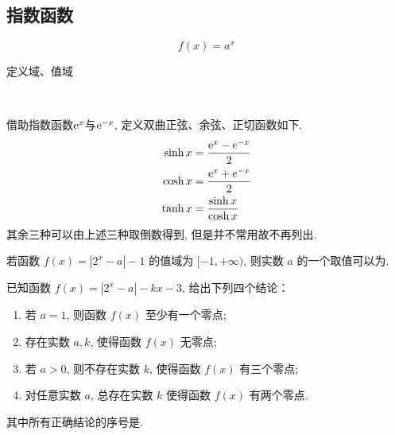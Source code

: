 \clearpage


\subsection{指数函数}
\begin{definition}[指数函数]
    \begin{equation}
        f(x)=a^x
    \end{equation}
\end{definition}
定义域、值域
\begin{theorem}[指数函数的单调性]
    
\end{theorem}
\begin{definition}[双曲三角函数]
    \ 

    借助指数函数$\mathrm{e} ^x$与$\mathrm{e} ^{-x}$, 定义双曲正弦、余弦、正切函数如下. 
\begin{align}
\sinh x&=\frac{\mathrm{e}^x-e^{-x}}{2}\\
\cosh x&=\frac{\mathrm{e}^x+e^{-x}}{2}\\
\tanh x&=\frac{\sinh x}{\cosh x}
\end{align}
其余三种可以由上述三种取倒数得到, 但是并不常用故不再列出. 
\end{definition}



\clearpage

\hw
\begin{homework}
若函数 \( f(x) = |2^{x} - a| - 1 \) 的值域为 \([-1, +\infty)\), 则实数 \( a \) 的一个取值可以为\underline{\hspace{2cm}}.
\end{homework}

\begin{homework}
已知函数 \( f(x) = |2^{x} - a| - kx - 3 \), 给出下列四个结论：
\begin{enumerate}
  \item 若 \( a=1 \), 则函数 \( f(x) \) 至少有一个零点; 
  \item 存在实数 \( a, k \), 使得函数 \( f(x) \) 无零点; 
  \item 若 \( a>0 \), 则不存在实数 \( k \), 使得函数 \( f(x) \) 有三个零点; 
  \item 对任意实数 \( a \), 总存在实数 \( k \) 使得函数 \( f(x) \) 有两个零点. 
\end{enumerate}
其中所有正确结论的序号是\underline{\hspace{2cm}}.
\end{homework}